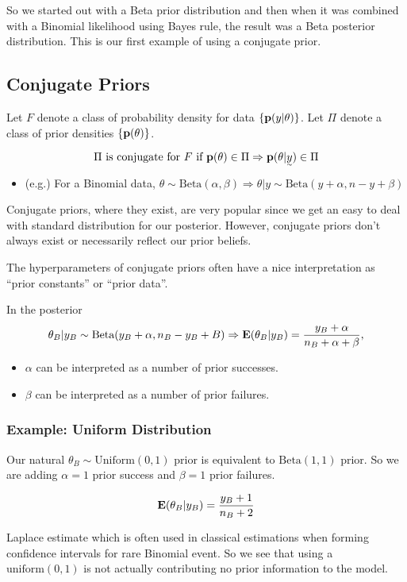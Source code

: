 So we started out with a Beta prior distribution and then when it was combined with a Binomial likelihood using Bayes rule, the result was a Beta posterior distribution. This is our first example of using a conjugate prior.

\subsection{Conjugate Priors}

Let $F$ denote a class of probability density for data $\{{\mathbf p}(y|\theta)\}$. Let $\Pi$ denote a class of prior densities $\{{\mathbf p}(\theta)\}$.

\[
\Pi \text{ is conjugate for $F$ if } \p(\theta) \in \Pi \Rightarrow \p(\theta| \vec{y}) \in \Pi
\]

\begin{itemize}
    \item (e.g.) For a Binomial data, $\theta \sim \text{Beta}(\alpha, \beta) \Rightarrow \theta| y \sim \text{Beta}(y+\alpha, n-y+\beta)$
\end{itemize}

Conjugate priors, where they exist, are very popular since we get an easy to deal with standard distribution for our posterior. However, conjugate priors don't always exist or necessarily reflect our prior beliefs.

The hyperparameters of conjugate priors often have a nice interpretation as ``prior constants'' or ``prior data''.

In the posterior
\[
    \theta_B | y_B \sim \text{Beta}(y_B+\alpha, n_B-y_B+B) \Rightarrow {\mathbf E}(\theta_B| y_B) = \frac{y_B + \alpha}{n_B + \alpha + \beta},
\]
\begin{itemize}
    \item $\alpha$ can be interpreted as a number of prior successes.
    \item $\beta$ can be interpreted as a number of prior failures.
\end{itemize}
\subsubsection*{Example: Uniform Distribution}
Our natural $\theta_B \sim \text{Uniform}(0, 1)$ prior is equivalent to $\text{Beta}(1, 1)$ prior. So we are adding $\alpha=1$ prior success and $\beta=1$ prior failures.

\[
{\mathbf E}(\theta_B | y_B) = \frac{y_B + 1}{n_B + 2}
\]

Laplace estimate which is often used in classical estimations when forming confidence intervals for rare Binomial event. So we see that using a $\text{uniform}(0, 1)$ is not actually contributing no prior information to the model.


